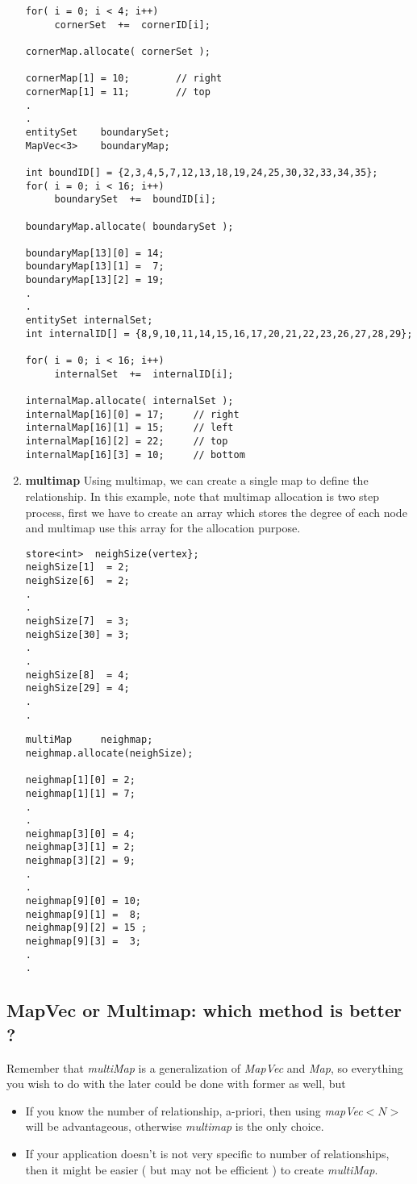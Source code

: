 \begin{enumerate}
\begin{verbatim}
for( i = 0; i < 4; i++)
     cornerSet  +=  cornerID[i];

cornerMap.allocate( cornerSet );

cornerMap[1] = 10;        // right
cornerMap[1] = 11;        // top
.
.
entitySet    boundarySet;
MapVec<3>    boundaryMap;

int boundID[] = {2,3,4,5,7,12,13,18,19,24,25,30,32,33,34,35};
for( i = 0; i < 16; i++)
     boundarySet  +=  boundID[i];

boundaryMap.allocate( boundarySet );

boundaryMap[13][0] = 14; 
boundaryMap[13][1] =  7; 
boundaryMap[13][2] = 19; 
.
.
entitySet internalSet;
int internalID[] = {8,9,10,11,14,15,16,17,20,21,22,23,26,27,28,29};

for( i = 0; i < 16; i++)
     internalSet  +=  internalID[i];

internalMap.allocate( internalSet );
internalMap[16][0] = 17;     // right
internalMap[16][1] = 15;     // left
internalMap[16][2] = 22;     // top
internalMap[16][3] = 10;     // bottom
\end{verbatim}
%
\item {\bf multimap}  Using multimap, we can create a single map to define the
relationship. In this example, note that multimap allocation is two step process,
first we have to create an array which stores the degree of each node and multimap
use this array for the allocation purpose.
%
\begin{verbatim}
store<int>  neighSize(vertex};
neighSize[1]  = 2;
neighSize[6]  = 2;
.
.
neighSize[7]  = 3;
neighSize[30] = 3;
.
.
neighSize[8]  = 4;
neighSize[29] = 4;
.
.
\end{verbatim}
%
\begin{verbatim}
multiMap     neighmap;
neighmap.allocate(neighSize);

neighmap[1][0] = 2;
neighmap[1][1] = 7;
.
.
neighmap[3][0] = 4;
neighmap[3][1] = 2;
neighmap[3][2] = 9;
.
.
neighmap[9][0] = 10;
neighmap[9][1] =  8;
neighmap[9][2] = 15 ;
neighmap[9][3] =  3;
.
.
\end{verbatim}
\end{enumerate}
\subsection{ MapVec or Multimap: which method is better ? }
\par Remember that {\em multiMap} is a generalization of {\em MapVec } and {\em Map}, 
so everything you wish to do with the later could be done with former as well, but
\begin{itemize}
\item  If you know the number of relationship, a-priori, then using {\em mapVec$<N>$} 
will be advantageous, otherwise {\em multimap} is the only choice. 
\item  If your application doesn't is not very specific to number of relationships,
then it might be easier ( but may not be efficient ) to create {\em multiMap}.
\end{itemize}

